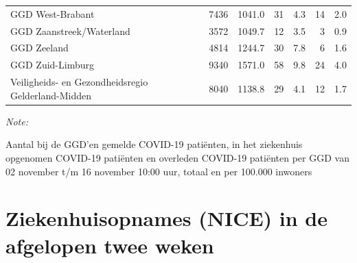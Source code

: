 \documentclass[
  english,
  man,floatsintext]{apa6}
\begin{document}
\begin{table}
\begin{threeparttable}
\begin{tabular}{lrrrrrr}
GGD West-Brabant & 7436 & 1041.0 & 31 & 4.3 & 14 & 2.0\\
GGD Zaanstreek/Waterland & 3572 & 1049.7 & 12 & 3.5 & 3 & 0.9\\
GGD Zeeland & 4814 & 1244.7 & 30 & 7.8 & 6 & 1.6\\
GGD Zuid-Limburg & 9340 & 1571.0 & 58 & 9.8 & 24 & 4.0\\
Veiligheids- en Gezondheidsregio Gelderland-Midden & 8040 & 1138.8 & 29 & 4.1 & 12 & 1.7\\
\bottomrule
\end{tabular}
\begin{tablenotes}
\item \textit{Note: } 
\item Aantal bij de GGD’en gemelde COVID-19 patiënten, in het ziekenhuis opgenomen COVID-19 patiënten en overleden COVID-19 patiënten per GGD van 02 november t/m 16 november 10:00 uur, totaal en per 100.000 inwoners
\end{tablenotes}
\end{threeparttable}
\endgroup{}
\end{table}

\newpage

\hypertarget{ziekenhuisopnames-nice-in-de-afgelopen-twee-weken}{%
\section{Ziekenhuisopnames (NICE) in de afgelopen twee weken}\label{ziekenhuisopnames-nice-in-de-afgelopen-twee-weken}}
\end{document}
